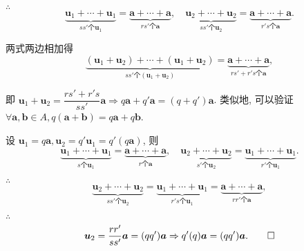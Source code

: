 \documentclass[color=black,device=normal,lang=cn,mode=geye]{elegantnote}
\begin{document}
\begin{solution}
    $\therefore$
    \[\underbrace{\boldsymbol{u}_1+\cdots+\boldsymbol{u}_1}_{ss'\text{个}\boldsymbol{u}_1}=\underbrace{\boldsymbol{a}+\cdots+\boldsymbol{a}}_{rs'\text{个}\boldsymbol{a}},\quad \underbrace{\boldsymbol{u}_2+\cdots+\boldsymbol{u}_2}_{ss'\text{个}\boldsymbol{u}_2}=\underbrace{\boldsymbol{a}+\cdots+\boldsymbol{a}}_{r's\text{个}\boldsymbol{a}}.\]

    两式两边相加得
    \[\underbrace{(\boldsymbol{u}_1+\boldsymbol{u}_2)+\cdots+(\boldsymbol{u}_1+\boldsymbol{u}_2)}_{ss'\text{个}(\boldsymbol{u}_1+\boldsymbol{u}_2)}=\underbrace{\boldsymbol{a}+\cdots+\boldsymbol{a}}_{rs'+r's\text{个}\boldsymbol{a}},\]

    即 $\boldsymbol{u}_1+\boldsymbol{u}_2=\dfrac{rs'+r's}{ss'}\boldsymbol{a}\Rightarrow q\boldsymbol{a}+q'\boldsymbol{a}=(q+q')\boldsymbol{a}$. 类似地, 可以验证 $\forall\boldsymbol{a},\boldsymbol{b}\in A,q(\boldsymbol{a}+\boldsymbol{b})=q\boldsymbol{a}+q\boldsymbol{b}$.

    设 $\boldsymbol{u}_1=q\boldsymbol{a},\boldsymbol{u}_2=q'\boldsymbol{u}_1=q'(q\boldsymbol{a})$, 则
    \[\underbrace{\boldsymbol{u}_1+\cdots+\boldsymbol{u}_1}_{s\text{个}\boldsymbol{u}_1}=\underbrace{\boldsymbol{a}+\cdots+\boldsymbol{a}}_{r\text{个}\boldsymbol{a}},\quad\underbrace{\boldsymbol{u}_2+\cdots+\boldsymbol{u}_2}_{s'\text{个}\boldsymbol{u}_2}=\underbrace{\boldsymbol{u}_1+\cdots+\boldsymbol{u}_1}_{r'\text{个}\boldsymbol{u}_1}.\]

    $\therefore$
    \[\underbrace{\boldsymbol{u}_2+\cdots+\boldsymbol{u}_2}_{ss'\text{个}\boldsymbol{u}_2}=\underbrace{\boldsymbol{u}_1+\cdots+\boldsymbol{u}_1}_{r's\text{个}\boldsymbol{u}_1}=\underbrace{\boldsymbol{a}+\cdots+\boldsymbol{a}}_{rr'\text{个}\boldsymbol{a}},\]

    $\therefore$
    \[\boldsymbol{u}_2=\dfrac{rr'}{ss'}\boldsymbol{a}=(qq')\boldsymbol{a}\Rightarrow q'(q)\boldsymbol{a}=(qq')\boldsymbol{a}.\qedhere\]
\end{solution}
\end{document}
